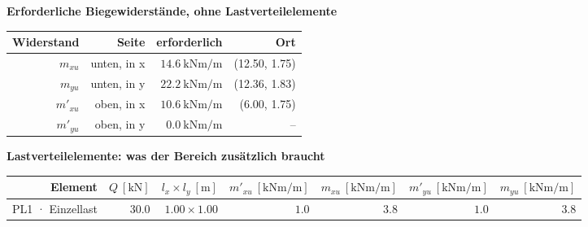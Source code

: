\documentclass[11pt,a4paper]{article}
\begin{document}
\noindent\textbf{Erforderliche Biegewiderstände, ohne Lastverteilelemente}
\begin{longtable}{rrrr}
\hline
Widerstand & Seite & erforderlich & Ort \\
\hline
\endhead
$m_{xu}$ & unten, in x & $14.6\ \mathrm{kNm/m}$ & (12.50, 1.75) \\
$m_{yu}$ & unten, in y & $22.2\ \mathrm{kNm/m}$ & (12.36, 1.83) \\
$m'_{xu}$ & oben, in x & $10.6\ \mathrm{kNm/m}$ & (6.00, 1.75) \\
$m'_{yu}$ & oben, in y & $0.0\ \mathrm{kNm/m}$ & – \\
\hline
\end{longtable}
\noindent\textbf{Lastverteilelemente: was der Bereich zusätzlich braucht}
\begin{longtable}{rrrrrrr}
\hline
Element & $Q\ [\mathrm{kN}]$ & $l_x \times l_y\ [\mathrm{m}]$ & $m'_{xu}\ [\mathrm{kNm/m}]$ & $m_{xu}\ [\mathrm{kNm/m}]$ & $m'_{yu}\ [\mathrm{kNm/m}]$ & $m_{yu}\ [\mathrm{kNm/m}]$ \\
\hline
\endhead
PL1 · Einzellast & $30.0$ & $1.00 \times 1.00$ & $1.0$ & $3.8$ & $1.0$ & $3.8$ \\
\hline
\end{longtable}
\end{document}

